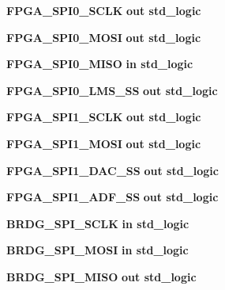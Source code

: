 \begin{DoxyCompactItemize}
\item 
{\bf F\+P\+G\+A\+\_\+\+S\+P\+I0\+\_\+\+S\+C\+LK}  {\bfseries {\bfseries \textcolor{keywordflow}{out}\textcolor{vhdlchar}{ }}} {\bfseries \textcolor{comment}{std\+\_\+logic}\textcolor{vhdlchar}{ }} 
\item 
{\bf F\+P\+G\+A\+\_\+\+S\+P\+I0\+\_\+\+M\+O\+SI}  {\bfseries {\bfseries \textcolor{keywordflow}{out}\textcolor{vhdlchar}{ }}} {\bfseries \textcolor{comment}{std\+\_\+logic}\textcolor{vhdlchar}{ }} 
\item 
{\bf F\+P\+G\+A\+\_\+\+S\+P\+I0\+\_\+\+M\+I\+SO}  {\bfseries {\bfseries \textcolor{keywordflow}{in}\textcolor{vhdlchar}{ }}} {\bfseries \textcolor{comment}{std\+\_\+logic}\textcolor{vhdlchar}{ }} 
\item 
{\bf F\+P\+G\+A\+\_\+\+S\+P\+I0\+\_\+\+L\+M\+S\+\_\+\+SS}  {\bfseries {\bfseries \textcolor{keywordflow}{out}\textcolor{vhdlchar}{ }}} {\bfseries \textcolor{comment}{std\+\_\+logic}\textcolor{vhdlchar}{ }} 
\item 
{\bf F\+P\+G\+A\+\_\+\+S\+P\+I1\+\_\+\+S\+C\+LK}  {\bfseries {\bfseries \textcolor{keywordflow}{out}\textcolor{vhdlchar}{ }}} {\bfseries \textcolor{comment}{std\+\_\+logic}\textcolor{vhdlchar}{ }} 
\item 
{\bf F\+P\+G\+A\+\_\+\+S\+P\+I1\+\_\+\+M\+O\+SI}  {\bfseries {\bfseries \textcolor{keywordflow}{out}\textcolor{vhdlchar}{ }}} {\bfseries \textcolor{comment}{std\+\_\+logic}\textcolor{vhdlchar}{ }} 
\item 
{\bf F\+P\+G\+A\+\_\+\+S\+P\+I1\+\_\+\+D\+A\+C\+\_\+\+SS}  {\bfseries {\bfseries \textcolor{keywordflow}{out}\textcolor{vhdlchar}{ }}} {\bfseries \textcolor{comment}{std\+\_\+logic}\textcolor{vhdlchar}{ }} 
\item 
{\bf F\+P\+G\+A\+\_\+\+S\+P\+I1\+\_\+\+A\+D\+F\+\_\+\+SS}  {\bfseries {\bfseries \textcolor{keywordflow}{out}\textcolor{vhdlchar}{ }}} {\bfseries \textcolor{comment}{std\+\_\+logic}\textcolor{vhdlchar}{ }} 
\item 
{\bf B\+R\+D\+G\+\_\+\+S\+P\+I\+\_\+\+S\+C\+LK}  {\bfseries {\bfseries \textcolor{keywordflow}{in}\textcolor{vhdlchar}{ }}} {\bfseries \textcolor{comment}{std\+\_\+logic}\textcolor{vhdlchar}{ }} 
\item 
{\bf B\+R\+D\+G\+\_\+\+S\+P\+I\+\_\+\+M\+O\+SI}  {\bfseries {\bfseries \textcolor{keywordflow}{in}\textcolor{vhdlchar}{ }}} {\bfseries \textcolor{comment}{std\+\_\+logic}\textcolor{vhdlchar}{ }} 
\item 
{\bf B\+R\+D\+G\+\_\+\+S\+P\+I\+\_\+\+M\+I\+SO}  {\bfseries {\bfseries \textcolor{keywordflow}{out}\textcolor{vhdlchar}{ }}} {\bfseries \textcolor{comment}{std\+\_\+logic}\textcolor{vhdlchar}{ }} 

\end{DoxyCompactItemize}
